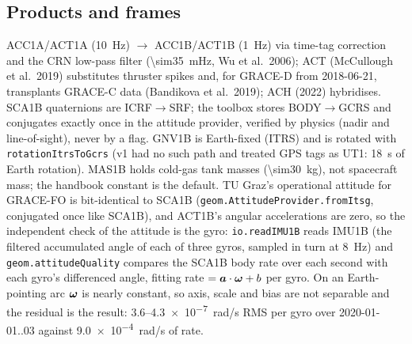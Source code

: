 \subsection{Products and frames}
ACC1A/ACT1A (\SI{10}{Hz}) $\to$ ACC1B/ACT1B (\SI{1}{Hz}) via time-tag correction and the CRN low-pass filter (\SI{\sim35}{mHz}, Wu et al.\ 2006); ACT (McCullough et al.\ 2019) substitutes thruster spikes and, for GRACE-D from 2018-06-21, transplants GRACE-C data (Bandikova et al.\ 2019); ACH (2022) hybridises. SCA1B quaternions are ICRF$\to$SRF; the toolbox stores BODY$\to$GCRS and conjugates exactly once in the attitude provider, verified by physics (nadir and line-of-sight), never by a flag. GNV1B is Earth-fixed (ITRS) and is rotated with \texttt{rotationItrsToGcrs} (v1 had no such path and treated GPS tags as UT1: \SI{18}{\second} of Earth rotation). MAS1B holds cold-gas tank masses (\SI{\sim30}{kg}), not spacecraft mass; the handbook constant is the default. TU Graz's operational attitude for GRACE-FO is bit-identical to SCA1B (\texttt{geom.AttitudeProvider.fromItsg}, conjugated once like SCA1B), and ACT1B's angular accelerations are zero, so the independent check of the attitude is the gyro: \texttt{io.readIMU1B} reads IMU1B (the filtered accumulated angle of each of three gyros, sampled in turn at \SI{8}{Hz}) and \texttt{geom.attitudeQuality} compares the SCA1B body rate over each second with each gyro's differenced angle, fitting rate $=\bm{a}\cdot\bm{\omega}+b$ per gyro. On an Earth-pointing arc $\bm{\omega}$ is nearly constant, so axis, scale and bias are not separable and the residual is the result: \SI{3.6}{}--\SI{4.3e-7}{rad/s} RMS per gyro over 2020-01-01..03 against \SI{9.0e-4}{rad/s} of rate.

